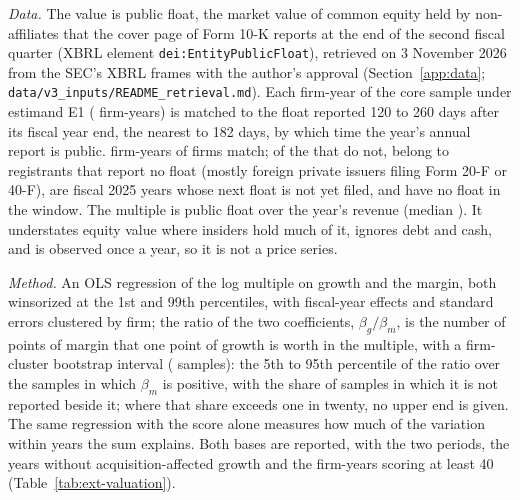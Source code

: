 \emph{Data.} The value is public float, the market value of common equity held by non-affiliates that the cover page of Form 10-K reports at the end of the second fiscal quarter (XBRL element \texttt{dei:EntityPublicFloat}), retrieved on 3 November 2026 from the SEC's XBRL frames \citep{sec2026xbrlapi} with the author's approval (Section~\ref{app:data}; \texttt{data/v3\_inputs/README\_retrieval.md}). Each firm-year of the core sample under estimand E1 (\ExPanelN{} firm-years) is matched to the float reported 120 to 260 days after its fiscal year end, the nearest to 182 days, by which time the year's annual report is public. \ExMatchN{} firm-years of \ExMatchFirms{} firms match; of the \ExUnmN{} that do not, \ExUnmNoFloat{} belong to registrants that report no float (mostly foreign private issuers filing Form 20-F or 40-F), \ExUnmLate{} are fiscal 2025 years whose next float is not yet filed, and \ExUnmOther{} have no float in the window. The multiple is public float over the year's revenue (median \ExMultMed). It understates equity value where insiders hold much of it, ignores debt and cash, and is observed once a year, so it is not a price series.

\emph{Method.} An OLS regression of the log multiple on growth and the margin, both winsorized at the 1st and 99th percentiles, with fiscal-year effects and standard errors clustered by firm; the ratio of the two coefficients, $\beta_g/\beta_m$, is the number of points of margin that one point of growth is worth in the multiple, with a firm-cluster bootstrap interval (\ExBoot{} samples): the 5th to 95th percentile of the ratio over the samples in which $\beta_m$ is positive, with the share of samples in which it is not reported beside it; where that share exceeds one in twenty, no upper end is given. The same regression with the score alone measures how much of the variation within years the sum explains. Both bases are reported, with the two periods, the years without acquisition-affected growth and the firm-years scoring at least 40 (Table~\ref{tab:ext-valuation}).



